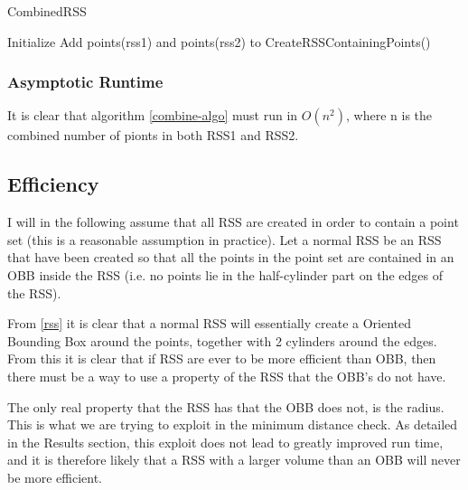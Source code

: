 \begin{algorithm}[H]
  \caption{CombinedRSS}
  \label{combine-algo}
   
  \dontprintsemicolon
  Initialize \points \;
  Add points(rss1) and points(rss2) to \points \;
  \return CreateRSSContainingPoints(\points) \;
\end{algorithm}

\subsubsection{Asymptotic Runtime}
It is clear that algorithm \ref{combine-algo} must run in $O(n^2)$, where n is the combined number of pionts in both RSS1 and RSS2. 


\subsection{Efficiency}
I will in the following assume that all RSS are created in order to contain a point set (this is a reasonable assumption in practice). Let a normal RSS be an RSS that have been created so that all the points in the point set are contained in an OBB inside the RSS (i.e. no points lie in the half-cylinder part on the edges of the RSS).  

From \ref{rss} it is clear that a normal RSS will essentially create a Oriented Bounding Box around the points, together with 2 cylinders around the edges. From this it is clear that if RSS are ever to be more efficient than OBB, then there must be a way to use a property of the RSS that the OBB's do not have. 

The only real property that the RSS has that the OBB does not, is the radius. This is what we are trying to exploit in the minimum distance check. As detailed in the Results section, this exploit does not lead to greatly improved run time, and it is therefore likely that a RSS with a larger volume than an OBB will never be more efficient. 

